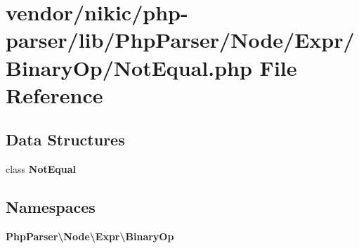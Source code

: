\section{vendor/nikic/php-\/parser/lib/\+Php\+Parser/\+Node/\+Expr/\+Binary\+Op/\+Not\+Equal.php File Reference}
\label{_not_equal_8php}
\subsection*{Data Structures}
\begin{DoxyCompactItemize}
\item 
class {\bf Not\+Equal}
\end{DoxyCompactItemize}
\subsection*{Namespaces}
\begin{DoxyCompactItemize}
\item 
 {\bf Php\+Parser\textbackslash{}\+Node\textbackslash{}\+Expr\textbackslash{}\+Binary\+Op}
\end{DoxyCompactItemize}
